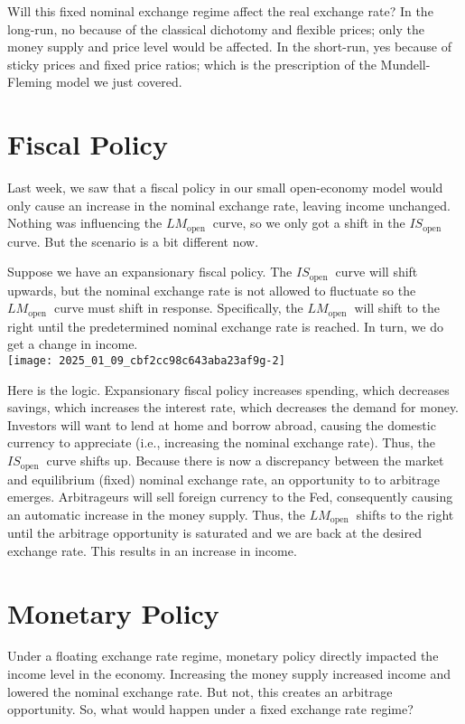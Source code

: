 \documentclass[10pt]{article}
\begin{document}
Will this fixed nominal exchange regime affect the real exchange rate? In the long-run, no because of the classical dichotomy and flexible prices; only the money supply and price level would be affected. In the short-run, yes because of sticky prices and fixed price ratios; which is the prescription of the Mundell-Fleming model we just covered.

\section*{Fiscal Policy}
Last week, we saw that a fiscal policy in our small open-economy model would only cause an increase in the nominal exchange rate, leaving income unchanged. Nothing was influencing the $L M_{\text {open }}$ curve, so we only got a shift in the $I S_{\text {open }}$ curve. But the scenario is a bit different now.

Suppose we have an expansionary fiscal policy. The $I S_{\text {open }}$ curve will shift upwards, but the nominal exchange rate is not allowed to fluctuate so the $L M_{\text {open }}$ curve must shift in response. Specifically, the $L M_{\text {open }}$ will shift to the right until the predetermined nominal exchange rate is reached. In turn, we do get a change in income.\\
\texttt{[image: 2025\_01\_09\_cbf2cc98c643aba23af9g-2]}

Here is the logic. Expansionary fiscal policy increases spending, which decreases savings, which increases the interest rate, which decreases the demand for money. Investors will want to lend at home and borrow abroad, causing the domestic currency to appreciate (i.e., increasing the nominal exchange rate). Thus, the $I S_{\text {open }}$ curve shifts up. Because there is now a discrepancy between the market and equilibrium (fixed) nominal exchange rate, an opportunity to to arbitrage emerges. Arbitrageurs will sell foreign currency to the Fed, consequently causing an automatic increase in the money supply. Thus, the $L M_{\text {open }}$ shifts to the right until the arbitrage opportunity is saturated and we are back at the desired exchange rate. This results in an increase in income.

\section*{Monetary Policy}
Under a floating exchange rate regime, monetary policy directly impacted the income level in the economy. Increasing the money supply increased income and lowered the nominal exchange rate. But not, this creates an arbitrage opportunity. So, what would happen under a fixed exchange rate regime?
\end{document}
